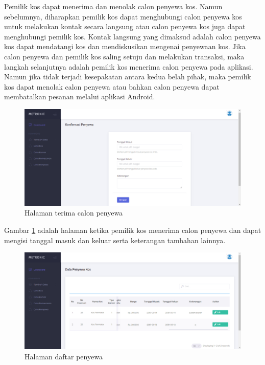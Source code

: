 \begin{enumerate}[a.]
		Pemilik kos dapat menerima dan menolak calon penyewa kos. Namun sebelumnya, diharapkan pemilik kos dapat menghubungi calon penyewa kos untuk melakukan kontak secara langsung atau calon penyewa kos juga dapat menghubungi pemilik kos. Kontak langsung yang dimaksud adalah calon penyewa kos dapat mendatangi kos dan mendiskusikan mengenai penyewaan kos. Jika calon penyewa dan pemilik kos saling setuju dan melakukan transaksi, maka langkah selanjutnya adalah pemilik kos menerima calon penyewa pada aplikasi. Namun jika tidak terjadi kesepakatan antara kedua belah pihak, maka pemilik kos dapat menolak calon penyewa atau bahkan calon penyewa dapat membatalkan pesanan melalui aplikasi Android.
		
		\begin{figure}[H]
			\centering
			\includegraphics[width=\textwidth]{gambar/web/13}
			\caption{Halaman terima calon penyewa}
			\label{web13}
		\end{figure}
		
		Gambar \ref{web13} adalah halaman ketika pemilik kos menerima calon penyewa dan dapat mengisi tanggal masuk dan keluar serta keterangan tambahan lainnya.
		
		\begin{figure}[H]
			\centering
			\includegraphics[width=\textwidth]{gambar/web/14}
			\caption{Halaman daftar penyewa}
			\label{web14}
		\end{figure}
		

\end{enumerate}
